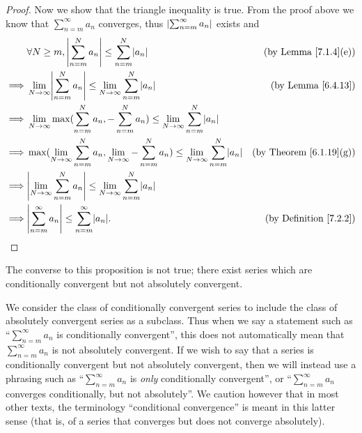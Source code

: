 \begin{proof}
    Now we show that the triangle inequality is true.
    From the proof above we know that \(\sum_{n = m}^\infty a_n\) converges, thus \(\left\lvert\sum_{n = m}^\infty a_n\right\rvert\) exists and
    \begin{align*}
                 & \forall N \geq m, \abs{\sum_{n = m}^N a_n} \leq \sum_{n = m}^N \abs{a_n}                                                                & \text{(by Lemma \ref{7.1.4}(e))}    \\
        \implies & \lim_{N \to \infty} \abs{\sum_{n = m}^N a_n} \leq \lim_{N \to \infty} \sum_{n = m}^N \abs{a_n}                                          & \text{(by Lemma \ref{6.4.13})}      \\
        \implies & \lim_{N \to \infty} \max(\sum_{n = m}^N a_n, -\sum_{n = m}^N a_n) \leq \lim_{N \to \infty} \sum_{n = m}^N \abs{a_n}                                                           \\
        \implies & \max(\lim_{N \to \infty} \sum_{n = m}^N a_n, \lim_{N \to \infty} -\sum_{n = m}^N a_n) \leq \lim_{N \to \infty} \sum_{n = m}^N \abs{a_n} & \text{(by Theorem \ref{6.1.19}(g))} \\
        \implies & \abs{\lim_{N \to \infty} \sum_{n = m}^N a_n} \leq \lim_{N \to \infty} \sum_{n = m}^N \abs{a_n}                                                                                \\
        \implies & \abs{\sum_{n = m}^\infty a_n} \leq \sum_{n = m}^\infty \abs{a_n}.                                                                       & \text{(by Definition \ref{7.2.2})}
    \end{align*}
\end{proof}

\begin{remark}\label{7.2.10}
    The converse to this proposition is not true;
    there exist series which are conditionally convergent but not absolutely convergent.
\end{remark}

\begin{remark}\label{7.2.11}
    We consider the class of conditionally convergent series to include the class of absolutely convergent series as a subclass.
    Thus when we say a statement such as ``\(\sum_{n = m}^\infty a_n\) is conditionally convergent'', this does not automatically mean that \(\sum_{n = m}^\infty a_n\) is not absolutely convergent.
    If we wish to say that a series is conditionally convergent but not absolutely convergent, then we will instead use a phrasing such as ``\(\sum_{n = m}^\infty a_n\) is \emph{only} conditionally convergent'', or ``\(\sum_{n = m}^\infty a_n\) converges conditionally, but not absolutely''.
    We caution however that in most other texts, the terminology ``conditional convergence'' is meant in this latter sense
    (that is, of a series that converges but does not converge absolutely).
\end{remark}


